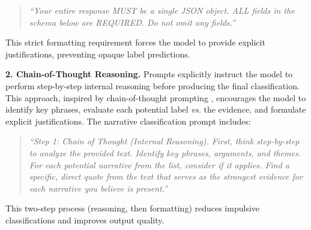 \begin{quote}
\small
\textit{``Your entire response MUST be a single JSON object. ALL fields in the schema below are REQUIRED. Do not omit any fields.''}
\end{quote}

\noindent This strict formatting requirement forces the model to provide explicit justifications, preventing opaque label predictions.

\noindent\textbf{2. Chain-of-Thought Reasoning.} 
Prompts explicitly instruct the model to perform step-by-step internal reasoning before producing the final classification. 
This approach, inspired by chain-of-thought prompting \citep{wei2022chain}, encourages the model to identify key phrases, evaluate each potential label \textit{vs.} the evidence, and formulate explicit justifications. 
The narrative classification prompt includes:

\begin{quote}
\small
\textit{``Step 1: Chain of Thought (Internal Reasoning). First, think step-by-step to analyze the provided text. Identify key phrases, arguments, and themes. For each potential narrative from the list, consider if it applies. Find a specific, direct quote from the text that serves as the strongest evidence for each narrative you believe is present.''}
\end{quote}

\noindent This two-step process (reasoning, then formatting) reduces impulsive classifications and improves output quality.

